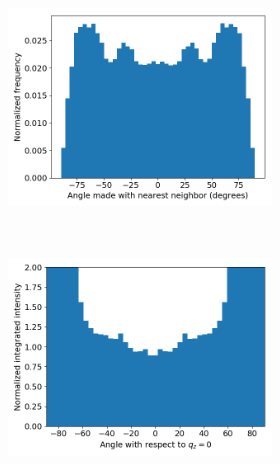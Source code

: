 \documentclass[journal=jpcbfk,manusciprt=article]{achemso}
\begin{document}
  \begin{figure}[!htb]
  \centering
  	\begin{subfigure}{\linewidth}
	\centering
		\begin{subfigure}{0.45\textwidth}
        		\centering
        		\includegraphics[width=\linewidth]{offset_tail_packing.png}
        		\caption{}~\label{fig:offset_tails}
		\end{subfigure}
		\begin{subfigure}{0.45\textwidth}
		\centering
	        	\includegraphics[width=\linewidth]{offset_angle_v_I.png}
		        \caption{}~\label{fig:offset_integration}
		\end{subfigure}
	\end{subfigure}

\end{figure}
\end{document}
